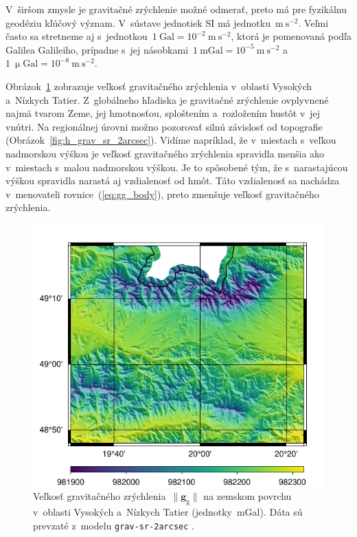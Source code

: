 \documentclass[a4paper, 12pt]{book}
\newcommand{\gidx}{\mathrm g}
\let\vec\mathbf
\begin{document}
V~širšom zmysle je gravitačné zrýchlenie možné odmerať, preto má pre fyzikálnu 
geodéziu kľúčový význam.  V~sústave jednotiek SI má jednotku~$\mathrm{m}\ 
\mathrm{s}^{-2}$.  Veľmi často sa stretneme aj s~jednotkou~$1\ \mathrm{Gal} 
= 10^{-2}\ \mathrm{m}\ \mathrm{s}^{-2}$, ktorá je pomenovaná podľa Galilea 
Galileiho, prípadne s~jej násobkami~$1\ \mathrm{mGal} = 10^{-5}\ \mathrm{m}\ 
\mathrm{s}^{-2}$ a~$1\ \upmu \mathrm{Gal} = 10^{-8}\ \mathrm{m}\ 
\mathrm{s}^{-2}$.

Obrázok~\ref{fig:gg_grav_sr_2arcsec} zobrazuje veľkosť gravitačného zrýchlenia 
v~oblasti Vysokých a~Nízkych Tatier.  Z~globálneho hľadiska je gravitačné 
zrýchlenie ovplyvnené najmä tvarom Zeme, jej hmotnosťou, sploštením 
a~rozložením hustôt v~jej vnútri.  Na regionálnej úrovni možno pozorovať silnú 
závislosť od topografie (Obrázok~\ref{fig:h_grav_sr_2arcsec}).  Vidíme 
napríklad, že v~miestach s~veľkou nadmorskou výškou je veľkosť gravitačného 
zrýchlenia spravidla menšia ako v~miestach s~malou nadmorskou výškou.  Je to 
spôsobené tým, že s~narastajúcou výškou spravidla narastá aj vzdialenosť od 
hmôt.  Táto vzdialenosť sa nachádza v~menovateli rovnice~(\ref{eq:gg_body}), 
preto zmenšuje veľkosť gravitačného zrýchlenia.

\begin{figure}
\centering
\includegraphics{./fig-gg-grav-sr-2arcsec.pdf}
\caption{Veľkosť gravitačného zrýchlenia~$\| \vec g_\gidx \|$ na zemskom 
povrchu v~oblasti Vysokých a~Nízkych Tatier (jednotky~mGal).  Dáta sú prevzaté 
z~modelu \texttt{grav-sr-2arcsec} \parencite{GravSR2arcsec}.}
\label{fig:gg_grav_sr_2arcsec}
\end{figure}
\end{document}
